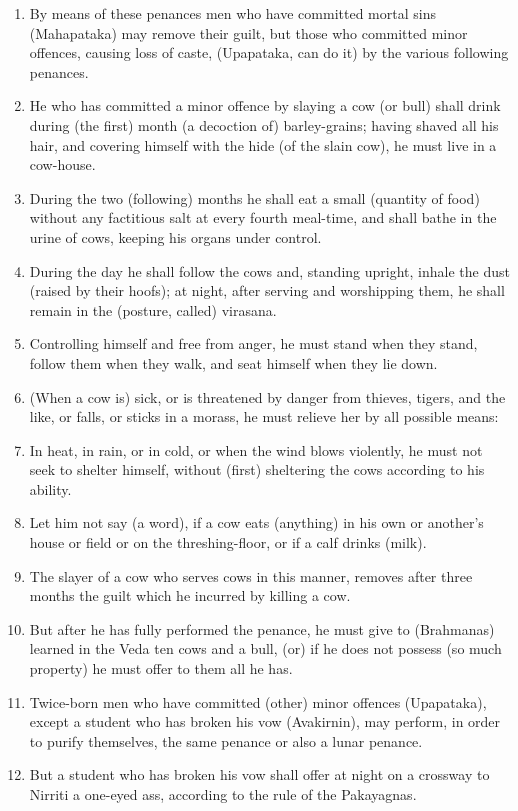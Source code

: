 \begin{enumerate}
\item By means of these penances men who have committed mortal sins (Mahapataka) may remove their guilt, but those who committed minor offences, causing loss of caste, (Upapataka, can do it) by the various following penances.
\item He who has committed a minor offence by slaying a cow (or bull) shall drink during (the first) month (a decoction of) barley-grains; having shaved all his hair, and covering himself with the hide (of the slain cow), he must live in a cow-house.
\item During the two (following) months he shall eat a small (quantity of food) without any factitious salt at every fourth meal-time, and shall bathe in the urine of cows, keeping his organs under control.
\item During the day he shall follow the cows and, standing upright, inhale the dust (raised by their hoofs); at night, after serving and worshipping them, he shall remain in the (posture, called) virasana.
\item Controlling himself and free from anger, he must stand when they stand, follow them when they walk, and seat himself when they lie down.
\item (When a cow is) sick, or is threatened by danger from thieves, tigers, and the like, or falls, or sticks in a morass, he must relieve her by all possible means:
\item In heat, in rain, or in cold, or when the wind blows violently, he must not seek to shelter himself, without (first) sheltering the cows according to his ability.
\item Let him not say (a word), if a cow eats (anything) in his own or another's house or field or on the threshing-floor, or if a calf drinks (milk).
\item The slayer of a cow who serves cows in this manner, removes after three months the guilt which he incurred by killing a cow.
\item But after he has fully performed the penance, he must give to (Brahmanas) learned in the Veda ten cows and a bull, (or) if he does not possess (so much property) he must offer to them all he has.
\item Twice-born men who have committed (other) minor offences (Upapataka), except a student who has broken his vow (Avakirnin), may perform, in order to purify themselves, the same penance or also a lunar penance.
\item But a student who has broken his vow shall offer at night on a crossway to Nirriti a one-eyed ass, according to the rule of the Pakayagnas.

\end{enumerate}
